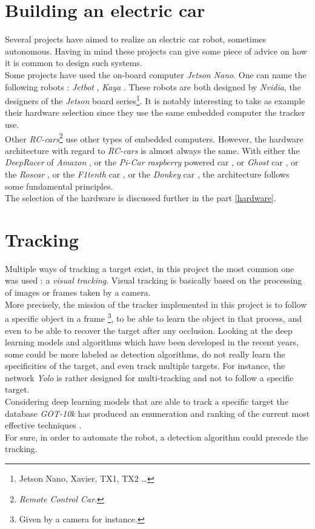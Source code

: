 		\section{Building an electric car}\label{buildingcar}
		
		Several projects have aimed to realize an electric car robot, sometimes autonomous. 
		Having in mind these projects can give some piece of advice on how it is common 
		to design such systems.
		\\\indent Some projects have used the on-board computer \textit{Jetson Nano}. 
		One can name the following robots : \textit{Jetbot} \cite{jetbot}, \textit{Kaya} \cite{kaya}.
		These robots are both designed by \textit{Nvidia}, the designers of the 
		\textit{Jetson} board series\footnote{Jetson Nano, Xavier, TX1, TX2 \dots}. It 
		is notably interesting to take as example their hardware selection since they
		use the same embedded computer the tracker use.
		\\\indent Other \textit{RC-cars}\footnote{\textit{Remote Control Car}.} use other types of embedded computers.
		However, the hardware architecture with regard to \textit{RC-cars} is 
		almost always the same. With either the \textit{DeepRacer} of \textit{Amazon} \cite{deepracer}, or
		the \textit{Pi-Car} \textit{raspberry} powered car \cite{rasp}, or 
		\textit{Ghost} car \cite{ghost}, or the \textit{Roscar} \cite{roscar}, or
		the \textit{F1tenth} car \cite{f1tenth}, or the \textit{Donkey} car \cite{donkey}, the architecture
		follows some fundamental principles.
		\\\indent The selection of the hardware is discussed further in the part \vref{hardware}.
		
		\section{Tracking}
		
		Multiple ways of tracking a target exist, in this project the most
		common one was used : a \textit{visual tracking}. Visual tracking
		is basically based on the processing of images or frames taken by a camera. 
		\\\indent More precisely, the mission of the tracker implemented
		in this project is to follow
		a specific object in a frame
		\footnote{Given by a camera for instance.}, to be able to 
		learn the object in that process, and even to be able to recover the target after 
		any occlusion. Looking at the deep learning models and algorithms 
		which have been developed in the recent years,
		some could be more labeled as detection algorithms, do not really learn the specificities 
		of the target, and even track multiple targets. For instance, the network \textit{Yolo} 
		\cite{bjelonicYolo2018} is rather designed for multi-tracking and 		not to follow a specific target. 
		\\\indent Considering deep learning models that are able to 
		track a specific target the database \textit{GOT-10k} has produced
		an enumeration and ranking of the current most effective techniques \cite{trakinglist}.
		\\\indent For sure, in order to automate the robot, a detection algorithm
		could precede the tracking.
		 
